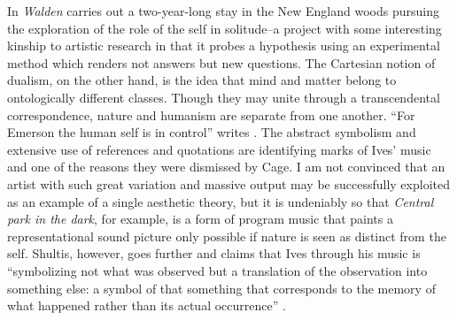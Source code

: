 \documentclass[a4paper]{article}
\begin{document}
In \emph{Walden} \citet{thoreau2004} carries out a two-year-long stay in the New England woods pursuing the exploration of the role of the self in solitude--a project with some interesting kinship to artistic research in that it probes a hypothesis using an experimental method which renders not answers but new questions. The Cartesian notion of dualism, on the other hand, is the idea that mind and matter belong to ontologically different classes. Though they may unite through a transcendental correspondence, nature and humanism are separate from one another. ``For Emerson the human self is in control'' writes \citet[][p. 14]{shultis98}. The abstract symbolism and extensive use of references and quotations are identifying marks of Ives' music and one of the reasons they were dismissed by Cage. I am not convinced that an artist with such great variation and massive output may be successfully exploited as an example of a single aesthetic theory, but it is undeniably so that \emph{Central park in the dark}, for example, is a form of program music that paints a representational sound picture only possible if nature is seen as distinct from the self. Shultis, however, goes further and claims that Ives through his music is ``symbolizing not what was observed but a translation of the observation into something else: a symbol of that something that corresponds to the memory of what happened rather than its actual occurrence'' \citep[p. 27]{shultis98}.
\end{document}
